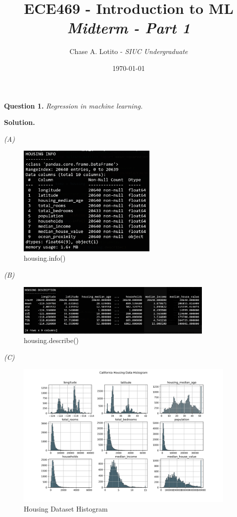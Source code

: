 \documentclass[10pt]{article}
\title{\textbf{ECE469 - Introduction to ML} \\ \textit{Midterm - Part 1}}
\author{Chase A. Lotito - \textit{SIUC Undergraduate}}
\date{\today}
\begin{document}

\maketitle


\textbf{Question 1.} \textit{Regression in machine learning.}

\bigskip
\textbf{Solution.}

\smallskip
\textit{(A)}
\begin{figure}[h]
    \includegraphics[width=0.6\textwidth]{../logs/housing_info.png}
    \centering
    \caption{housing.info()}
\end{figure}

\smallskip
\textit{(B)}
\begin{figure}[h]
    \includegraphics[width=0.85\textwidth]{../logs/housing_desc.png}
    \centering
    \caption{housing.describe()}
\end{figure}

\clearpage

\smallskip
\textit{(C)}
\begin{figure}[h]
    \includegraphics[width=0.95\textwidth]{../plots/q1/housing_histogram.png}
    \centering
    \caption{Housing Dataset Histogram}
\end{figure}
\end{document}
